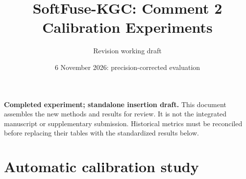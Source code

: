 \documentclass[10pt,a4paper]{article}
\title{SoftFuse-KGC: Comment 2 Calibration Experiments}
\author{Revision working draft}
\date{6 November 2026: precision-corrected evaluation}
\begin{document}
\maketitle
\noindent\textbf{Completed experiment; standalone insertion draft.}
This document assembles the new methods and results for review. It is not the
integrated manuscript or supplementary submission. Historical metrics must be
reconciled before replacing their tables with the standardized results below.
\section{Automatic calibration study}


\end{document}
